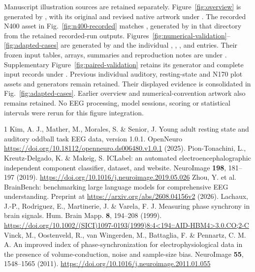 Manuscript illustration sources are retained separately. Figure~\ref*{fig:overview} is generated by , with its original and revised native artwork under . The recorded N400 asset in Fig.~\ref*{fig:n400-recorded} matches , generated by  in that directory from the retained recorded-run outputs. Figures~\ref*{fig:numerical-validation}--\ref*{fig:adapted-cases} are generated by  and the individual , , ,  and  entries. Their frozen input tables, arrays, summaries and reproduction notes are under . Supplementary Figure~\ref*{fig:paired-validation} retains its generator  and complete input records under . Previous individual auditory, resting-state and N170 plot assets and generators remain retained. Their displayed evidence is consolidated in Fig.~\ref*{fig:adapted-cases}. Earlier overview and numerical-convention artwork also remains retained. No EEG processing, model sessions, scoring or statistical intervals were rerun for this figure integration.

\FloatBarrier
\renewcommand{\refname}{Supplementary references}
\begin{thebibliography}{1}
\label{si:references}
Kim, A. J., Mather, M., Morales, S. \& Senior, J.
Young adult resting state and auditory oddball task EEG data, version 1.0.1.
OpenNeuro \url{https://doi.org/10.18112/openneuro.ds006480.v1.0.1} (2025).
Pion-Tonachini, L., Kreutz-Delgado, K. \& Makeig, S.
ICLabel: an automated electroencephalographic independent component classifier, dataset, and website.
NeuroImage \textbf{198}, 181--197 (2019). \url{https://doi.org/10.1016/j.neuroimage.2019.05.026}
Zhou, Y. et al.
BrainBench: benchmarking large language models for comprehensive EEG understanding.
Preprint at \url{https://arxiv.org/abs/2608.04156v2} (2026).
Lachaux, J.-P., Rodriguez, E., Martinerie, J. \& Varela, F. J.
Measuring phase synchrony in brain signals.
Hum. Brain Mapp. \textbf{8}, 194--208 (1999). \url{https://doi.org/10.1002/(SICI)1097-0193(1999)8:4<194::AID-HBM4>3.0.CO;2-C}
Vinck, M., Oostenveld, R., van Wingerden, M., Battaglia, F. \& Pennartz, C. M. A.
An improved index of phase-synchronization for electrophysiological data in the presence of volume-conduction, noise and sample-size bias.
NeuroImage \textbf{55}, 1548--1565 (2011). \url{https://doi.org/10.1016/j.neuroimage.2011.01.055}
\end{thebibliography}


